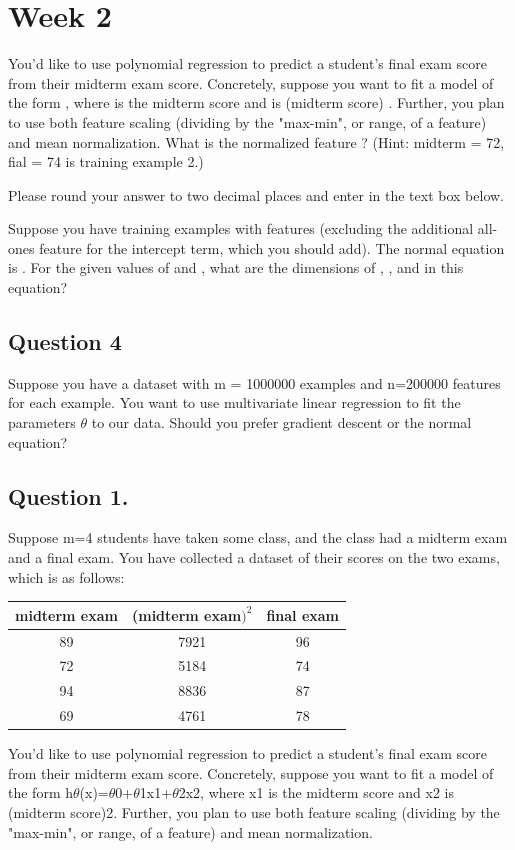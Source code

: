 \documentclass[11pt]{article} %
\begin{document}
	\section{Week 2}
	You'd like to use polynomial regression to predict a student's final exam score
	from their midterm exam score. Concretely, suppose you want to fit a model
	of the form , where is the midterm score and
	is (midterm score) . Further, you plan to use both feature scaling (dividing
	by the "max-min", or range, of a feature) and mean normalization.
	What is the normalized feature ? (Hint: midterm = 72, fial = 74 is training
	example 2.) 
	
	
	Please round your answer to two decimal places and enter in
	the text box below.
	
	
	Suppose you have training examples with features (excluding
	the additional all-ones feature for the intercept term, which you should add).
	The normal equation is . For the given values of and
	, what are the dimensions of , , and in this equation?
	
	\subsection{Question 4}
	Suppose you have a dataset with m = 1000000 examples and n=200000
	features for each example. You want to use multivariate linear regression to
	fit the parameters $\theta$ to our data. Should you prefer gradient descent or the
	normal equation?
	
	
	
	\subsection{Question 1.} 
	Suppose m=4 students have taken some class, and the class had a midterm exam and a final exam. You have collected a dataset of their scores on the two exams, which is as follows:
	\begin{center}
	\begin{tabular}{|c|c|c|}\hline 
		midterm exam &	(midterm exam$)^2$ &	final exam \\ \hline
		89 &	7921 &	96 \\
		72 &	5184 &	74 \\
		94 &	8836 &	87 \\
		69 &	4761 &	78 \\ \hline
	\end{tabular} 
	\end{center}
	You'd like to use polynomial regression to predict a student's final exam score from their midterm exam score. Concretely, suppose you want to fit a model of the form h$\theta$(x)=$\theta$0+$\theta$1x1+$\theta$2x2, where x1 is the midterm score and x2 is (midterm score)2. Further, you plan to use both feature scaling (dividing by the "max-min", or range, of a feature) and mean normalization.
	
\end{document}
